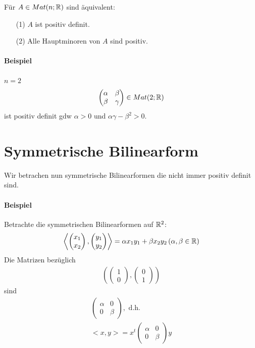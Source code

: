 \begin{satz} %
\label{satz515}
Für $A \in Mat(n; \mathbb{R})$ sind äquivalent:
\begin{itemize}
\item[(1)] $A$ ist positiv definit.
\item[(2)] Alle Hauptminoren von $A$ sind positiv.
\end{itemize}
\end{satz}

\paragraph{Beispiel}
$n = 2$
\begin{align}
\begin{pmatrix} \alpha & \beta \\ \beta & \gamma \end{pmatrix} \in Mat(2; \mathbb{R})
\end{align}
ist positiv definit gdw $\alpha > 0$ und $\alpha \gamma - \beta^2 > 0$.

\section{Symmetrische Bilinearform} %
Wir betrachen nun symmetrische Bilinearformen die nicht immer positiv definit sind.

\paragraph{Beispiel}
Betrachte die symmetrischen Bilinearformen auf $\mathbb{R}^2$:
\begin{align}
\left< \begin{pmatrix} x_1 \\ x_2 \end{pmatrix}, \begin{pmatrix} y_1 \\ y_2 \end{pmatrix}\right> = \alpha x_1 y_1 + \beta x_2 y_2\, (\alpha, \beta \in \mathbb{R})
\end{align}
Die Matrizen bezüglich
\begin{align}
\left( \begin{pmatrix} 1 \\ 0 \end{pmatrix}, \begin{pmatrix} 0 \\ 1 \end{pmatrix}\right)
\end{align}
sind
\begin{align}
\begin{pmatrix} \alpha & 0 \\ 0 & \beta \end{pmatrix}, \text{ d.h.} \\
<x, y> = x^t \begin{pmatrix} \alpha & 0 \\ 0 & \beta \end{pmatrix} y
\end{align}

